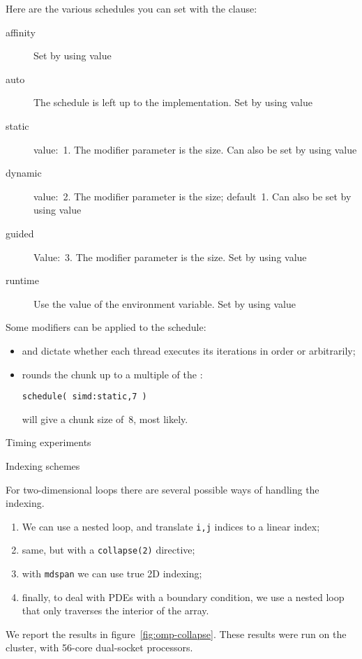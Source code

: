 Here are the various schedules you can set with the
 clause:
\begin{description}
  \item[affinity] Set by using value  
  \item[auto] The schedule is left up to the implementation. Set by
    using value 
  \item[static] value:~1. The modifier parameter is the  size.
    Can also be set by using value  
  \item[dynamic] value:~2. The modifier parameter is the
     size; default~1.
    Can also be set by using value
  \item[guided] Value:~3. The modifier parameter is the
     size. Set by using value
  \item[runtime] Use the value of the 
    environment variable. Set by using value
\end{description}

Some modifiers can be applied to the schedule:
\begin{itemize}
\item {} and 
  dictate whether each thread executes its iterations in order or arbitrarily;
\item {} rounds the chunk up to a multiple of the :
\begin{lstlisting}[language=omp]
schedule( simd:static,7 )
\end{lstlisting}
will give a chunk size of~8, most likely.
\end{itemize}

 {Timing experiments}

 {Indexing schemes}

For two-dimensional loops there are several possible ways of handling the indexing.
\begin{enumerate}
\item We can use a nested loop, and translate \lstinline{i,j} indices to a linear index;
\item same, but with a \lstinline[language=omp]{collapse(2)} directive;
\item with  \lstinline{mdspan} we can use true 2D indexing;
\item finally, to deal with \acp{PDE} with a boundary condition, we
  use a nested loop that only traverses the interior of the array.
\end{enumerate}
We report the results in figure~\ref{fig:omp-collapse}.
These results were run on the  cluster,
with 56-core dual-socket  processors.

